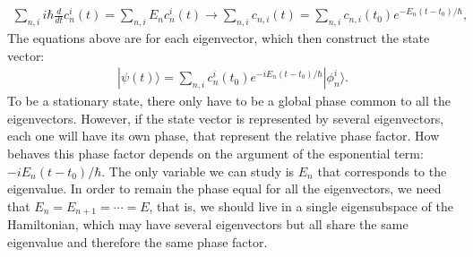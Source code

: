 \documentclass[letterpaper,11pt,twoside]{article}
\newcommand{\ket}[1]{|#1\rangle}
\begin{document}
\begin{enumerate}[itemsep=0pt,topsep=0pt,label=\alph*)]
  \begin{align*}
    \sum_{n,i}i\hbar\frac{d}{dt}c^i_n(t)=\sum_{n,i}E_nc^i_n(t)\longrightarrow\sum_{n,i}c_{n,i}(t)=\sum_{n,i}c_{n,i}(t_0)e^{-E_n(t-t_0)/\hbar},
  \end{align*} 
  The equations above are for each eigenvector, which then construct the state vector:
  \begin{align*}
    \ket{\psi(t)}=\sum_{n,i}c_n^i(t_0)e^{-iE_n(t-t_0)/\hbar}\ket{\phi_n^i}.
  \end{align*} 
  To be a stationary state, there only have to be a global phase common to all the eigenvectors. However, if the state vector is represented by several eigenvectors,
  each one will have its own phase, that represent the relative phase factor. How behaves this phase factor depends on the argument of the esponential term:
  $-iE_n(t-t_0)/\hbar$. The only variable we can study is $E_n$ that corresponds to the eigenvalue. In order to remain the phase equal for all the eigenvectors, 
  we need that $E_n=E_{n+1}=\cdots=E$, that is, we should live in a single eigensubspace of the Hamiltonian, which may have several eigenvectors but all share the same eigenvalue and therefore 
  the same phase factor. 
\end{enumerate}
\end{document}
